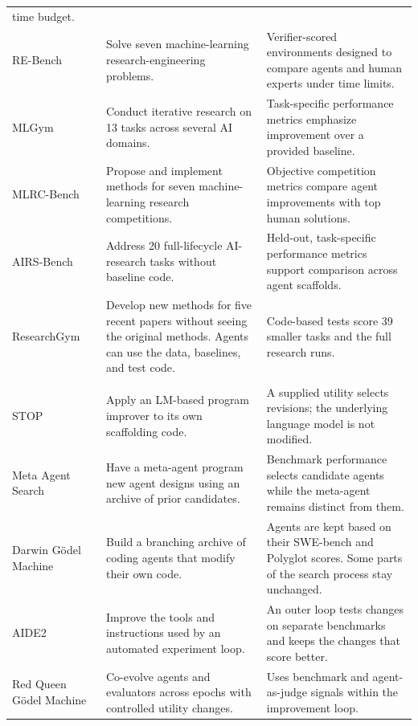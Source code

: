 {\begin{longtable}{@{}P{0.21\textwidth}P{0.30\textwidth}P{0.39\textwidth}@{}}
time budget. \\
RE-Bench~\citep{rebench} & Solve seven machine-learning research-engineering
problems. & Verifier-scored environments designed to compare agents and human
experts under time limits. \\
MLGym~\citep{mlgym} & Conduct iterative research on 13 tasks across several AI
domains. & Task-specific performance metrics emphasize improvement over a
provided baseline. \\
MLRC-Bench~\citep{mlrcbench} & Propose and implement methods for seven
machine-learning research competitions. & Objective competition metrics compare
agent improvements with top human solutions. \\
AIRS-Bench~\citep{airsbench} & Address 20 full-lifecycle AI-research tasks
without baseline code. & Held-out, task-specific performance metrics support
comparison across agent scaffolds. \\
ResearchGym~\citep{researchgym} & Develop new methods for five recent papers
without seeing the original methods. Agents can use the data, baselines, and
test code. & Code-based tests score 39 smaller tasks and the full research
runs. \\
\addlinespace[4pt]
 \\
\addlinespace[2pt]
STOP~\citep{stop} & Apply an LM-based program improver to its own scaffolding
code. & A supplied utility selects revisions; the underlying language model is
not modified. \\
Meta Agent Search~\citep{adas} & Have a meta-agent program new agent designs
using an archive of prior candidates. & Benchmark performance selects candidate
agents while the meta-agent remains distinct from them. \\
Darwin G\"odel Machine~\citep{darwingodel} & Build a branching archive of
coding agents that modify their own code. & Agents are kept based on their
SWE-bench and Polyglot scores. Some parts of the search process stay unchanged. \\
AIDE2~\citep{aide2} & Improve the tools and instructions used by an automated
experiment loop. & An outer loop tests changes on separate benchmarks and
keeps the changes that score better. \\
Red Queen G\"odel Machine~\citep{redqueengodel} & Co-evolve agents and
evaluators across epochs with controlled utility changes. & Uses benchmark and
agent-as-judge signals within the improvement loop. \\

\end{longtable}}
